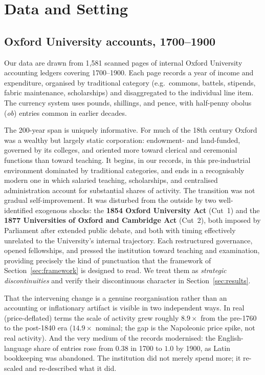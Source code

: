 \documentclass[11pt]{article}
\begin{document}
\section{Data and Setting}
\label{sec:data}

\subsection{Oxford University accounts, 1700--1900}

Our data are drawn from 1{,}581 scanned pages of internal Oxford University accounting ledgers
covering 1700--1900. Each page records a year of income and expenditure, organised by traditional
category (e.g.\ commons, battels, stipends, fabric maintenance, scholarships) and disaggregated
to the individual line item. The currency system uses pounds, shillings, and pence, with
half-penny obolus (\emph{ob}) entries common in earlier decades.

The 200-year span is uniquely informative. For much of the 18th century Oxford was a wealthy but
largely static corporation: endowment- and land-funded, governed by its colleges, and oriented
more toward clerical and ceremonial functions than toward teaching. It begins, in our records, in
this pre-industrial environment dominated by traditional categories, and ends in a recognisably
modern one in which salaried teaching, scholarships, and centralised administration account for
substantial shares of activity. The transition was not gradual self-improvement. It was disturbed
from the outside by two well-identified exogenous shocks: the \textbf{1854 Oxford University Act}
(Cut~1) and the \textbf{1877 Universities of Oxford and Cambridge Act} (Cut~2), both imposed by
Parliament after extended public debate, and both with timing effectively unrelated to the
University's internal trajectory. Each restructured governance, opened fellowships, and pressed
the institution toward teaching and examination, providing precisely the kind of punctuation that
the framework of Section~\ref{sec:framework} is designed to read. We treat them as \emph{strategic
discontinuities} and verify their discontinuous character in Section~\ref{sec:results}.

That the intervening change is a genuine reorganisation rather than an accounting or
inflationary artifact is visible in two independent ways. In real (price-deflated) terms the
scale of activity grew roughly $8.9\times$ from the pre-1760 to the post-1840 era ($14.9\times$
nominal; the gap is the Napoleonic price spike, not real activity). And the very medium of the
records modernised: the English-language share of entries rose from $0.38$ in 1700 to $1.0$ by
1900, as Latin bookkeeping was abandoned. The institution did not merely spend more; it
re-scaled and re-described what it did.
\end{document}
